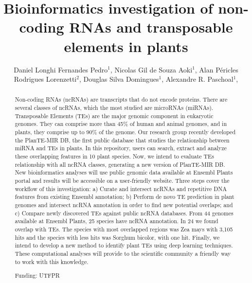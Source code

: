 \documentclass[twoside]{article}
\title{\vspace{-15mm}\fontsize{24pt}{10pt}\selectfont\textbf{ Bioinformatics investigation of non-coding RNAs and transposable elements in plants }} %
\author{ Daniel Longhi Fernandes Pedro$^{1}$, Nicolas Gil de Souza Aoki$^{1}$, Alan Péricles Rodrigues Lorenzetti$^{2}$, Douglas Silva Domingues$^{1}$, Alexandre R. Paschoal$^{1}$, }
\affil{ 1 UTFPR - PPGBIOINFO

2 University of São Paulo

 }
\date{}
\begin{document}
  
  
  \maketitle %
  
  
  \thispagestyle{fancy} %
  
  
  \begin{abstract}
  Non-coding RNAs (ncRNAs) are transcripts that do not encode proteins. There are several classes of ncRNAs, which the most studied are microRNAs (miRNAs). Transposable Elements (TEs) are the major genomic component in eukaryotic genomes. They can comprise more than 45\% of human and animal genomes, and in plants, they comprise up to 90\% of the genome. Our research group recently developed the PlanTE-MIR DB, the first public database that studies the relationship between miRNA and TEs in plants. In this repository, users can search, extract and analyze these overlapping features in 10 plant species. Now, we intend to evaluate TEs relationship with all ncRNA classes, generating a new version of PlanTE-MIR DB. New bioinformatics analyses will use public genomic data available at Ensembl Plants portal and results will be accessible on a user-friendly website. Three steps cover the workflow of this investigation: a) Curate and intersect ncRNAs and repetitive DNA features from existing Ensembl annotation; b) Perform de novo TE prediction in plant genomes and intersect ncRNA annotation in order to find new potential overlaps; and c) Compare newly discovered TEs against public ncRNA databases. From 44 genomes available at Ensembl Plants, 25 species have ncRNA annotation. In 24 we found overlap with TEs. The species with most overlapped regions was Zea mays with 3,105 hits and the species with less hits was Sorghum bicolor, with one hit. Finally, we intend to develop a new method to identify plant TEs using deep learning techniques. These computational analyses will provide to the scientific community a friendly way to work with this knowledge.
  
  Funding: UTFPR \\ 
  \end{abstract}
  
\end{document}
